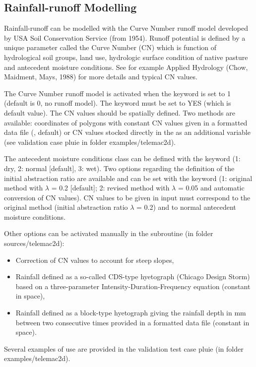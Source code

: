 \subsection{Rainfall-runoff Modelling}

Rainfall-runoff can be modelled with the Curve Number runoff model developed
by USA Soil Conservation Service (from 1954).
Runoff potential is defined by a unique parameter called the Curve Number (CN)
which is function of hydrological soil groups, land use, hydrologic surface
condition of native pasture and antecedent moisture conditions.
See for example Applied Hydrology (Chow, Maidment, Mays, 1988)
for more details and typical CN values. 

The Curve Number runoff model is activated when the keyword
 is set to 1 (default is 0, no runoff model).
The keyword  must be set to YES (which is default value).
The CN values should be spatially defined.
Two methods are available: coordinates of polygons with constant CN values
given in a formatted data file (, default)
or CN values stocked directly in the  as
an additional variable (see validation case pluie in folder examples/telemac2d).

The antecedent moisture conditions class can be defined with the keyword
 (1: dry, 2: normal [default], 3: wet).
Two options regarding the definition of the initial abstraction ratio are
available
and can be set with the keyword 
(1: original method with $\lambda$ = 0.2 [default];
 2: revised method with $\lambda$ = 0.05 and automatic conversion of CN values).
CN values to be given in input must correspond to the original method
(initial abstraction ratio $\lambda$ = 0.2) and to normal antecedent moisture
conditions.

Other options can be activated manually in the 
subroutine (in folder sources/telemac2d):
\begin{itemize}
\item Correction of CN values to account for steep slopes,
\item Rainfall defined as a so-called CDS-type hyetograph (Chicago Design
Storm) based on a three-parameter Intensity-Duration-Frequency equation
(constant in space),
\item Rainfall defined as a block-type hyetograph giving the rainfall depth
in mm between two consecutive times provided in a formatted data file (constant
in space).
\end{itemize}
Several examples of use are provided in the validation test case pluie
(in folder examples/telemac2d).


